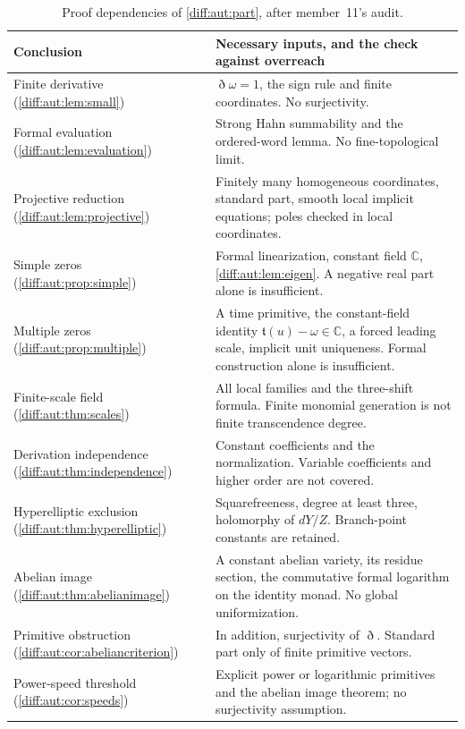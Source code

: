 \documentclass[11pt,letterpaper]{article}
\numberwithin{equation}{section}
\theoremstyle{definition}
\theoremstyle{remark}
\newcommand{\C}{\mathbb C}
\newcommand{\Dn}{\eth}
\begin{document}
\begin{table}[htbp]
\centering\small
\caption{Proof dependencies of \cref{diff:aut:part}, after member~11's audit.}
\label{diff:aut:tab:dependencies}
\begin{tabularx}{\textwidth}{@{}L{0.25\textwidth}Y@{}}
\toprule
Conclusion & Necessary inputs, and the check against overreach \\
\midrule
Finite derivative (\cref{diff:aut:lem:small}) & $\Dn\omega=1$, the sign rule and
finite coordinates. No surjectivity. \\
Formal evaluation (\cref{diff:aut:lem:evaluation}) & Strong Hahn summability and
the ordered-word lemma. No fine-topological limit. \\
Projective reduction (\cref{diff:aut:lem:projective}) & Finitely many homogeneous
coordinates, standard part, smooth local implicit equations; poles checked in
local coordinates. \\
Simple zeros (\cref{diff:aut:prop:simple}) & Formal linearization, constant field
$\C$, \cref{diff:aut:lem:eigen}. A negative real part alone is insufficient. \\
Multiple zeros (\cref{diff:aut:prop:multiple}) & A time primitive, the constant-field
identity $\mathfrak t(u)-\omega\in\C$, a forced leading scale, implicit unit
uniqueness. Formal construction alone is insufficient. \\
Finite-scale field (\cref{diff:aut:thm:scales}) & All local families and the
three-shift formula. Finite monomial generation is not finite transcendence
degree. \\
Derivation independence (\cref{diff:aut:thm:independence}) & Constant coefficients
and the normalization. Variable coefficients and higher order are not covered. \\
Hyperelliptic exclusion (\cref{diff:aut:thm:hyperelliptic}) & Squarefreeness,
degree at least three, holomorphy of $dY/Z$. Branch-point constants are
retained. \\
Abelian image (\cref{diff:aut:thm:abelianimage}) & A constant abelian variety, its
residue section, the commutative formal logarithm on the identity monad. No
global uniformization. \\
Primitive obstruction (\cref{diff:aut:cor:abeliancriterion}) & In addition,
surjectivity of $\Dn$. Standard part only of finite primitive vectors. \\
Power-speed threshold (\cref{diff:aut:cor:speeds}) & Explicit power or
logarithmic primitives and the abelian image theorem; no surjectivity
assumption. \\
\bottomrule
\end{tabularx}
\end{table}
\end{document}

